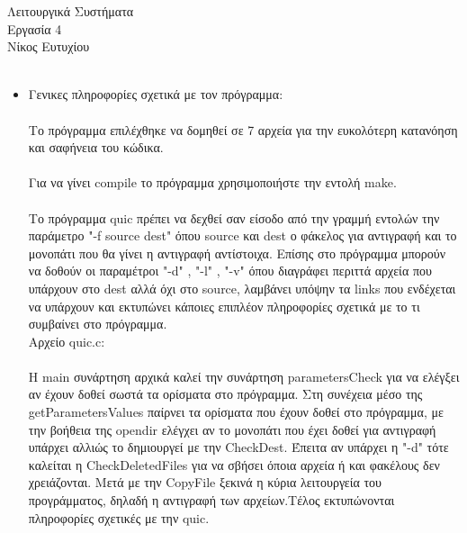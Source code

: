 \documentclass[10pt,a4]{article}
\newcommand{\la}{\latintext}
\begin{document}
\thispagestyle{empty}

\vspace*{-2.0cm}

{\large \sf
\begin{center}
{\large Λειτουργικά Συστήματα}\\
Eργασία 4 \\
Νίκος Ευτυχίου \\
\la{sdi1800221}\\
\end{center}
}

\baselineskip 

\begin{itemize}
\item
	{\sf Γενικες πληροφορίες σχετικά με τον πρόγραμμα:}\\ \\
	Το πρόγραμμα επιλέχθηκε να δομηθεί σε 7  αρχεία για την ευκολότερη κατανόηση και σαφήνεια του
	κώδικα.\\ \\
	Για να γίνει {\la compile} το πρόγραμμα χρησιμοποιήστε την εντολή {\la make}.\\ \\
	Το πρόγραμμα {\la quic} πρέπει  να δεχθεί σαν είσοδο από την γραμμή εντολών την παράμετρο {\la "-f source dest"}
	όπου {\la source} και {\la dest} ο φάκελος για αντιγραφή και το μονοπάτι που θα γίνει η αντιγραφή αντίστοιχα.
	Επίσης στο πρόγραμμα μπορούν να δοθούν οι παραμέτροι {\la "-d" , "-l" , "-v"} όπου διαγράφει περιττά αρχεία 
	που υπάρχουν στο {\la dest} αλλά όχι στο {\la source}, λαμβάνει υπόψην τα {\la links} που ενδέχεται να υπάρχουν
	και εκτυπώνει κάποιες επιπλέον πληροφορίες σχετικά με το τι συμβαίνει στο πρόγραμμα.\\
	
	
	
	
	{\sf Αρχείο {\la quic.c:}}\\ \\
	H {\la main} συνάρτηση αρχικά καλεί την συνάρτηση {\la parametersCheck} για να ελέγξει αν έχουν δοθεί σωστά
	τα ορίσματα στο πρόγραμμα. Στη συνέχεια μέσο της {\la getParametersValues} παίρνει τα ορίσματα που 
	έχουν δοθεί στο πρόγραμμα, με την βοήθεια της {\la opendir} ελέγχει αν το μονοπάτι που έχει δοθεί για αντιγραφή
	υπάρχει αλλιώς το δημιουργεί με την {\la CheckDest}. Έπειτα αν υπάρχει η {\la "-d" } τότε καλείται η 
	{\la CheckDeletedFiles} για να σβήσει όποια αρχεία ή και φακέλους δεν χρειάζονται. Μετά με την {\la CopyFile} 
	ξεκινά η κύρια λειτουργεία του προγράμματος, δηλαδή η αντιγραφή των αρχείων.Τέλος εκτυπώνονται πληροφορίες
	σχετικές με την {\la quic}.
	

\end{itemize}
\end{document}
